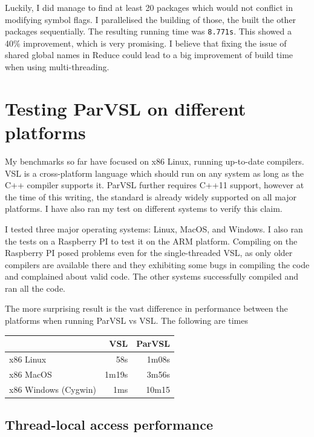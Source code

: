 Luckily, I did manage to find at least 20 packages which would not conflict in modifying symbol flags.
I parallelised the building of those, the built the other packages sequentially. The resulting
running time was \texttt{8.771s}. This showed a 40\% improvement, which is very promising.
I believe that fixing the issue of shared global names in Reduce could lead to a big improvement
of build time when using multi-threading.

\section{Testing ParVSL on different platforms}
\label{sec:crossplatform}

My benchmarks so far have focused on x86 Linux, running
up-to-date compilers. VSL is a cross-platform language which should run on any system as long as the
C++ compiler supports it. ParVSL further requires C++11 support, however at the
time of this writing, the standard is already widely supported on all major platforms.
I have also ran my test on different systems to verify this claim.

I tested three major operating systems: Linux, MacOS, and Windows. I also
ran the tests on a Raspberry PI to test it on the ARM platform. Compiling on the Raspberry PI
posed problems even for the single-threaded VSL, as only older compilers are available
there and they exhibiting some bugs in compiling the code and complained about valid code.
The other systems successfully compiled and ran all the code.

The more surprising result is the vast difference in performance between the platforms
when running ParVSL vs VSL. The following are times

\begin{center}
  \begin{tabular}{lrr}
                       & VSL    & ParVSL \\
  \hline
  x86 Linux            &   58s & 1m08s \\
  x86 MacOS            & 1m19s & 3m56s  \\
  x86 Windows (Cygwin) &   1ms & 10m15 \\
  \end{tabular}
\end{center}


\subsection{Thread-local access performance}

